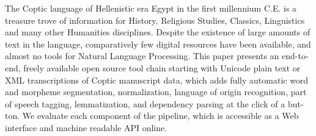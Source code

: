 The Coptic language of Hellenistic era Egypt in the first millennium C.E. is a treasure trove of information for History, Religious Studies, Classics, Linguistics and many other Humanities disciplines. Despite the existence of large amounts of text in the language, comparatively few digital resources have been available, and almost no tools for Natural Language Processing. This paper presents an end-to-end, freely available open source tool chain starting with Unicode plain text or XML transcriptions of Coptic manuscript data, which adds fully automatic word and morpheme segmentation, normalization, language of origin recognition, part of speech tagging, lemmatization, and dependency parsing at the click of a but-ton. We evaluate each component of the pipeline, which is accessible as a Web interface and machine readable API online.
